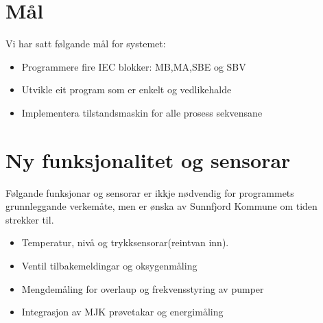 \newpage
\section{Mål}
Vi har satt følgande mål for systemet:

\begin{itemize}
    \item Programmere fire \gls{IEC} blokker: \gls{MB},\gls{MA},\gls{SBE} og \gls{SBV}
    \item Utvikle eit program som er enkelt og vedlikehalde
    \item Implementera tilstandsmaskin for alle prosess sekvensane
\end{itemize}

\section{Ny funksjonalitet og sensorar}
Følgande funksjonar og sensorar er ikkje nødvendig for programmets grunnleggande verkemåte, men 
er ønska av \gls{Sunnfjord Kommune} om tiden strekker til.  
\begin{itemize}
    \item Temperatur, nivå og trykksensorar(reintvan inn).
    \item Ventil tilbakemeldingar og oksygenmåling
    \item Mengdemåling for overlaup og frekvensstyring av pumper
    \item Integrasjon av \gls{MJK} prøvetakar og energimåling
\end{itemize}

